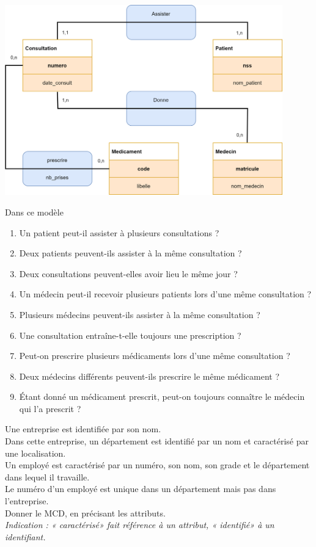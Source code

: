 \newpage
\begin{exercice}[]
    \begin{center}
        \includegraphics[width=12cm]{img/ex_consultation}
    \end{center}
    Dans ce modèle
    \begin{enumerate}
        \item 	Un patient peut-il assister à plusieurs consultations ?
        \item   Deux patients peuvent-ils assister à la même consultation ?
        \item   Deux consultations peuvent-elles avoir lieu le même jour ?
        \item 	Un médecin peut-il recevoir plusieurs patients lors d'une même consultation ?
        \item   Plusieurs médecins peuvent-ils assister à la même consultation ?
        \item   Une consultation entraîne-t-elle toujours une prescription ?
        \item 	Peut-on prescrire plusieurs médicaments lors d'une même consultation ?
        \item   Deux médecins différents peuvent-ils prescrire le même médicament ?
        \item   \'Etant donné un médicament prescrit, peut-on toujours connaître le médecin qui l'a prescrit ?
              
    \end{enumerate}
\end{exercice}


\begin{exercice}[]
    Une entreprise est identifiée par son nom.\\
    Dans cette entreprise, un département est identifié par un nom et caractérisé par une localisation.\\
    Un employé est caractérisé par un numéro, son nom, son grade et le département dans lequel il travaille.\\
    Le numéro d'un employé est unique dans un département mais pas dans l'entreprise.\\
    Donner le MCD, en précisant les attributs.\\
    
    \textit{Indication : « caractérisé» fait référence à un attribut, « identifié» à un identifiant.}
\end{exercice}

